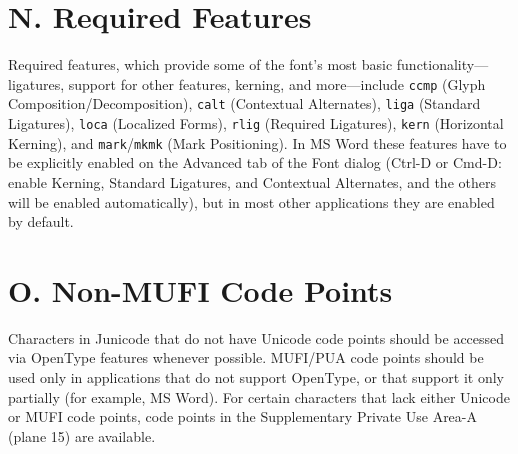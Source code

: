 \documentclass[12pt,letterpaper,openany]{book}
\newcommand\textSourceText[1]{{\color{GGOrange}\texttt{#1}}}
\newcounter{Feature}
\begin{document}
\hypertarget{req}{}\section{N. Required Features}
Required features, which provide some of the font’s most basic functionality---ligatures, support for
other features, kerning, and more---include \textSourceText{ccmp} (Glyph Composition/Decomposition),
\textSourceText{calt} (Contextual Alternates), \textSourceText{liga} (Standard Ligatures),
\textSourceText{loca} (Localized Forms), \textSourceText{rlig} (Required Ligatures),
\textSourceText{kern} (Horizontal Kerning), and \textSourceText{mark}/\textSourceText{mkmk} (Mark
Positioning). In MS Word these features have to be explicitly enabled on the Advanced tab of the Font dialog (Ctrl-D or
Cmd-D: enable Kerning, Standard Ligatures, and Contextual Alternates, and the others will be enabled automatically),
but in most other applications they are enabled by default.


\hypertarget{nonmufi}{}\section{O. Non-MUFI Code Points}
Characters in Junicode that do not have Unicode code points should be accessed via OpenType
features whenever possible. MUFI/PUA code points should be used only in applications that do not support OpenType, or
that support it only partially (for example, MS Word). For certain characters that lack either Unicode or MUFI code
points, code points in the Supplementary Private Use Area-A (plane 15) are available.
\end{document}

